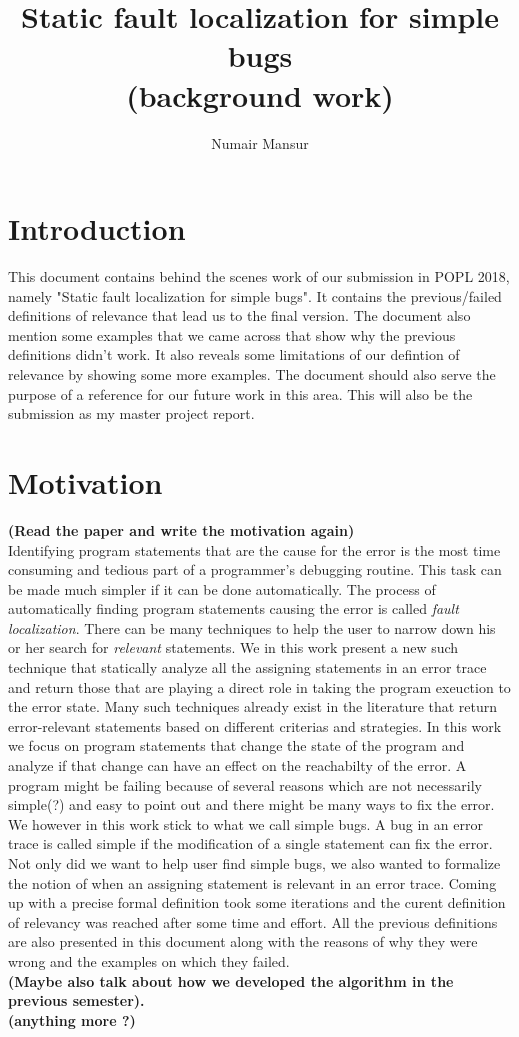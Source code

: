 \documentclass{article}
\title{Static fault localization for simple bugs \\ \normalsize{(background work)}}
\author{Numair Mansur}
\affil{University of Freiburg, Germany}
\date{\vspace{-5ex}}
\begin{document}
\maketitle
\section{Introduction}
This document contains behind the scenes work of our submission in POPL 2018, namely "Static fault localization for simple bugs". It contains the previous/failed definitions of relevance that lead us to the final version. The document also mention some examples that we came across that show why the previous definitions didn't work. It also reveals some limitations of our defintion of relevance by showing some more examples. The document should also serve the purpose of a reference for our future work in this area. This will also be the submission as my master project report.
\section{Motivation}
\textbf{(Read the paper and write the motivation again)} \\
Identifying program statements that are the cause for the error is the most time consuming and tedious part of a programmer's debugging routine. This task can be made much simpler if it can be done automatically. The process of automatically finding program statements causing the error is called \textit{fault localization}. There can be many techniques to help the user to narrow down his or her search for \textit{relevant} statements. We in this work present a new such technique that statically analyze all the assigning statements in an error trace and return those that are playing a direct role in taking the program exeuction to the error state. Many such techniques already exist in the literature that return error-relevant statements based on different criterias and strategies. In this work we focus on program statements that change the state of the program and analyze if that change can have an effect on the reachabilty of the error. A program might be failing because of several reasons which are not necessarily simple(?) and easy to point out and there might be many ways to fix the error. We however in this work stick to what we call simple bugs. A bug in an error trace is called simple if the modification of a single statement can fix the error.\\
Not only did we want to help user find simple bugs, we also wanted to formalize the notion of when an assigning statement is relevant in an error trace.
Coming up with a precise formal definition took some iterations and the curent definition of relevancy was reached after some time and effort. All the previous definitions are also presented in this document along with the reasons of why they were wrong and the examples on which they failed. 
\\ \textbf{(Maybe also talk about how we developed the algorithm in the previous semester).}
\\ \textbf{(anything more ?)}
\end{document}
